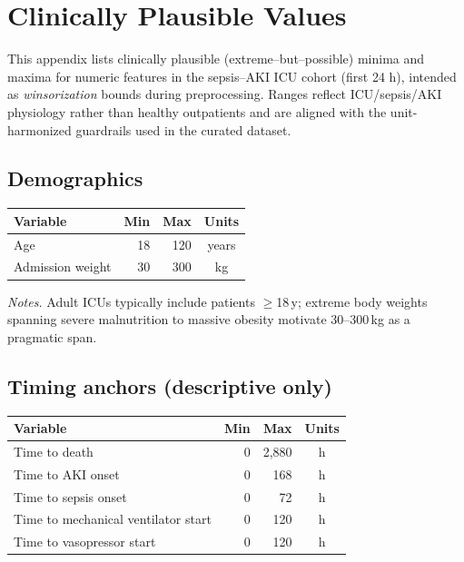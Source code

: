 \chapter{Clinically Plausible Values}
\label{app:clinical-plausible-values}

This appendix lists clinically plausible (extreme–but–possible) minima and maxima for numeric features in the sepsis–AKI ICU cohort (first 24 h), intended as \emph{winsorization} bounds during preprocessing. Ranges reflect ICU/sepsis/AKI physiology rather than healthy outpatients and are aligned with the unit-harmonized guardrails used in the curated dataset.

\vspace{0.75\baselineskip}
\section*{Demographics}
\vspace{0.75\baselineskip}
\renewcommand{\arraystretch}{1.12}
\setlength{\tabcolsep}{6pt}
\begin{table}[ht!]\centering\small
\begin{tabular}{lrrc}
\toprule
\textbf{Variable} & \textbf{Min} & \textbf{Max} & \textbf{Units} \\
\midrule
Age & 18 & 120 & years \\
Admission weight & 30 & 300 & kg \\
\bottomrule
\end{tabular}
\end{table}

\noindent\textit{Notes.} Adult ICUs typically include patients $\ge$18\,y; extreme body weights spanning severe malnutrition to massive obesity motivate 30–300\,kg as a pragmatic span.

\vspace{0.75\baselineskip}
\section*{Timing anchors (descriptive only)}
\vspace{0.75\baselineskip}
\begin{table}[ht!]\centering\small
\begin{tabular}{lrrc}
\toprule
\textbf{Variable} & \textbf{Min} & \textbf{Max} & \textbf{Units} \\
\midrule
Time to death & 0 & 2{,}880 & h \\
Time to AKI onset & 0 & 168 & h \\
Time to sepsis onset & 0 & 72 & h \\
Time to mechanical ventilator start & 0 & 120 & h \\
Time to vasopressor start & 0 & 120 & h \\
\bottomrule
\end{tabular}
\end{table}

